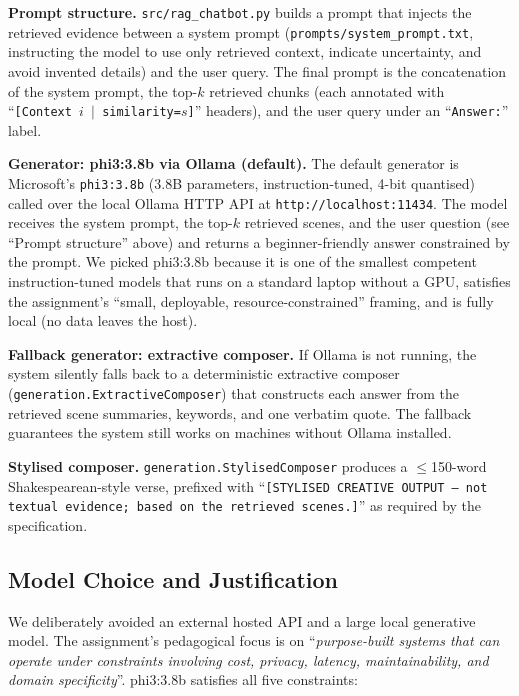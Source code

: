 \documentclass[10pt,twocolumn,a4paper]{article}
\begin{document}
\textbf{Prompt structure.} \verb|src/rag_chatbot.py| builds a prompt
that injects the retrieved evidence between a system prompt
(\verb|prompts/system_prompt.txt|, instructing the model to use only
retrieved context, indicate uncertainty, and avoid invented details)
and the user query. The final prompt is the concatenation of the
system prompt, the top-$k$ retrieved chunks (each annotated with
``\texttt{[Context $i$ $|$ similarity=$s$]}'' headers), and the user
query under an ``\texttt{Answer:}'' label.

\textbf{Generator: phi3:3.8b via Ollama (default).} The default
generator is Microsoft's \texttt{phi3:3.8b} (3.8B parameters,
instruction-tuned, 4-bit quantised) called over the local Ollama HTTP
API at \verb|http://localhost:11434|. The model receives the system
prompt, the top-$k$ retrieved scenes, and the user question (see
``Prompt structure'' above) and returns a beginner-friendly answer
constrained by the prompt. We picked phi3:3.8b because it is one of
the smallest competent instruction-tuned models that runs on a
standard laptop without a GPU, satisfies the assignment's
``small, deployable, resource-constrained'' framing, and is fully
local (no data leaves the host).

\textbf{Fallback generator: extractive composer.} If Ollama is not
running, the system silently falls back to a deterministic extractive
composer (\verb|generation.ExtractiveComposer|) that constructs each
answer from the retrieved scene summaries, keywords, and one verbatim
quote. The fallback guarantees the system still works on machines
without Ollama installed.

\textbf{Stylised composer.} \verb|generation.StylisedComposer|
produces a $\leq$150-word Shakespearean-style verse, prefixed with
``\texttt{[STYLISED CREATIVE OUTPUT -- not textual evidence; based on
the retrieved scenes.]}'' as required by the specification.

\subsection{Model Choice and Justification}

We deliberately avoided an external hosted API and a large local
generative model. The assignment's pedagogical focus is on
``\emph{purpose-built systems that can operate under constraints involving
cost, privacy, latency, maintainability, and domain specificity}''.
phi3:3.8b satisfies all five constraints:
\end{document}
